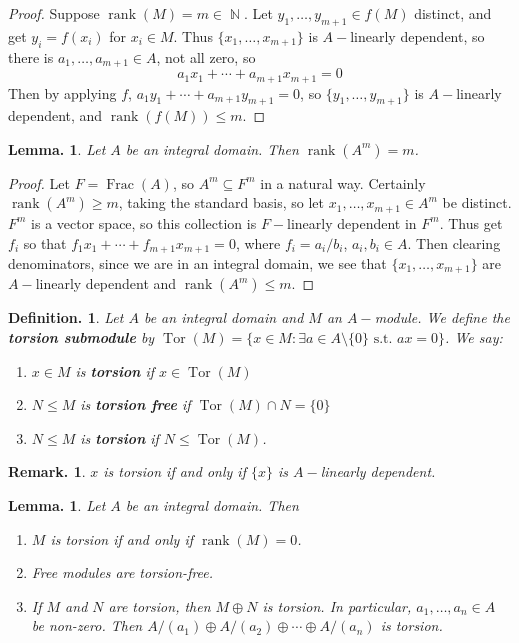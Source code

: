 \documentclass[11pt, a4paper]{memoir}
\DeclareMathOperator{\N}{{\mathbb{N}}}
\theoremstyle{change}
\newtheorem{lemma}[theorem]{Lemma.}
\theoremstyle{plain}
\theoremstyle{nonumberplain}
\newtheorem{definition}{Definition.}
\newtheorem{remark}{Remark.}
\newtheorem{proof}{Proof}
\DeclareMathOperator{\Frac}{Frac}
\DeclareMathOperator{\rank}{rank}
\DeclareMathOperator{\Tor}{Tor}
\numberwithin{equation}{section}
\begin{document}
\begin{proof}
    Suppose $\rank(M)=m\in\N$.
    Let $y_1,\ldots,y_{m+1}\in f(M)$ distinct, and get $y_i=f(x_i)$ for $x_i\in M$.
    Thus $\{x_1,\ldots,x_{m+1}\}$ is $A-$linearly dependent, so there is $a_1,\ldots,a_{m+1}\in A$, not all zero, so
    \begin{equation*}
        a_1x_1+\cdots+a_{m+1}x_{m+1}=0
    \end{equation*}
    Then by applying $f$, $a_1y_1+\cdots+a_{m+1}y_{m+1}=0$, so $\{y_1,\ldots,y_{m+1}\}$ is $A-$linearly dependent, and $\rank(f(M))\leq m$.
\end{proof}
\begin{lemma}
    Let $A$ be an integral domain.
    Then $\rank(A^m)=m$.
\end{lemma}
\begin{proof}
    Let $F=\Frac(A)$, so $A^m\subseteq F^m$ in a natural way.
    Certainly $\rank(A^m)\geq m$, taking the standard basis, so let $x_1,\ldots,x_{m+1}\in A^m$ be distinct.
    $F^m$ is a vector space, so this collection is $F-$linearly dependent in $F^m$.
    Thus get $f_i$ so that $f_1x_1+\cdots+f_{m+1}x_{m+1}=0$, where $f_i=a_i/b_i$, $a_i,b_i\in A$.
    Then clearing denominators, since we are in an integral domain, we see that $\{x_1,\ldots,x_{m+1}\}$ are $A-$linearly dependent and $\rank(A^m)\leq m$.
\end{proof}
\begin{definition}
    Let $A$ be an integral domain and $M$ an $A-$module.
    We define the \textbf{torsion submodule} by $\Tor(M)=\{x\in M:\exists a\in A\setminus \{0\}\text{ s.t. }ax=0\}$.
    We say:
    \begin{enumerate}[nolistsep]
        \item $x\in M$ is \textbf{torsion} if $x\in\Tor(M)$
        \item $N\leq M$ is \textbf{torsion free} if $\Tor(M)\cap N=\{0\}$
        \item $N\leq M$ is \textbf{torsion} if $N\leq\Tor(M)$.
    \end{enumerate}
\end{definition}
\begin{remark}
    $x$ is torsion if and only if $\{x\}$ is $A-$linearly dependent.
\end{remark}
\begin{lemma}\label{tor}
    Let $A$ be an integral domain.
    Then
    \begin{enumerate}[nolistsep,label=(\roman*)]
        \item $M$ is torsion if and only if $\rank(M)=0$.
        \item Free modules are torsion-free.
        \item If $M$ and $N$ are torsion, then $M\oplus N$ is torsion.
            In particular, $a_1,\ldots,a_n\in A$ be non-zero.
            Then $A/(a_1)\oplus A/(a_2)\oplus\cdots\oplus A/(a_n)$ is torsion.
    \end{enumerate}
\end{lemma}
\end{document}
